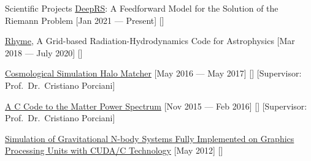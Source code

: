 \begin{cvsection}{Scientific Projects}
    \cvitem
    {\href{https://gitlab.com/rhyme-org/ml_riemann_solver}{DeepRS}: A Feedforward Model for the Solution of the Riemann Problem}
    [Jan 2021 --- Present]
    [\ipa]
    
    \cvitem
    {\href{https://gitlab.com/rhyme-org/rhyme}{Rhyme}, A Grid-based Radiation-Hydrodynamics Code for Astrophysics}
    [Mar 2018 --- July 2020]
    [\ipa]
    
    \cvitem
    {\href{https://github.com/saeedSarpas/HaloMatcher}{Cosmological Simulation Halo Matcher}}
    [May 2016 --- May 2017]
    [\AIfA]
    [Supervisor: Prof.\ Dr.\ Cristiano Porciani]
    
    \cvitem
    {\href{https://gitlab.com/saeedSarpas/MatterPSGenerator}{A C Code to the Matter Power Spectrum}}
    [Nov 2015 --- Feb 2016]
    [\AIfA]
    [Supervisor: Prof.\ Dr.\ Cristiano Porciani]
    
    \cvitem
    {\href{https://bitbucket.org/saeedSarpas/nbody-simulation/src/master}{Simulation of Gravitational N-body Systems Fully Implemented on Graphics Processing Units with CUDA/C Technology}}
    [May 2012]
    [\IASBS]
\end{cvsection}